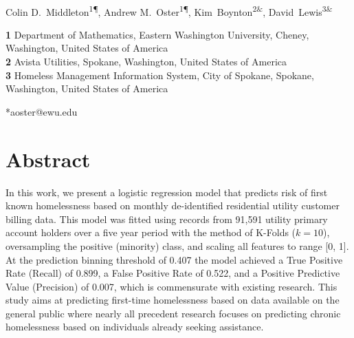 \documentclass[10pt,letterpaper]{article}
\begin{document}
\vspace*{0.2in}

\begin{flushleft}
{\Large
\textbf{} %
}
\newline
\\
Colin D.\ Middleton\textsuperscript{1\P},
Andrew M.\ Oster\textsuperscript{1\P*},
Kim\ Boynton\textsuperscript{2\&},
David\ Lewis\textsuperscript{3\&}\\

\bigskip

\textbf{1} Department of Mathematics, Eastern Washington University, Cheney, Washington, United States of America \\
\textbf{2} Avista Utilities, Spokane, Washington, United States of America \\
\textbf{3} Homeless Management Information System, City of Spokane, Spokane, Washington, United States of America \\
\bigskip





*aoster@ewu.edu

\end{flushleft}
\section*{Abstract}
In this work, we present a logistic regression model that predicts risk of first known homelessness based on monthly de-identified residential utility customer billing data. This model was fitted using records from 91,591 utility primary account holders over a five year period with the method of K-Folds ($k=10$), oversampling the positive (minority) class, and scaling all features to range [0, 1]. At the prediction binning threshold of 0.407 the model achieved a True Positive Rate (Recall) of 0.899, a False Positive Rate of 0.522, and a Positive Predictive Value (Precision) of 0.007, which is commensurate with existing research. This study aims at predicting first-time homelessness based on data available on the general public where nearly all precedent research focuses on predicting chronic homelessness based on individuals already seeking assistance.
\end{document}
